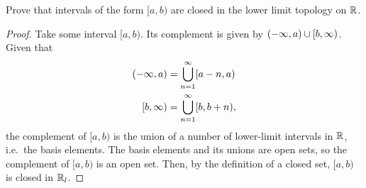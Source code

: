\documentclass[twocolumn, noxcolor, maketitle]{rbt-mathnotes-hw}
\begin{document}
\begin{problem}[1.32]
  Prove that intervals of the form $[a, b)$ are closed in the lower limit
  topology on $\mathbb{R}$.
\end{problem}
\begin{proof}
  Take some interval $[a, b)$. Its complement is given by $(-\infty, a) \cup
  [b, \infty)$. Given that
  \begin{alignat*}{1}
    (-\infty, a) &= \bigcup_{n=1}^\infty [a-n, a) \\
    [b, \infty) &= \bigcup_{n=1}^\infty [b, b+n),
  \end{alignat*}
  the complement of $[a, b)$ is the union of a number of lower-limit intervals
  in $\mathbb{R}$, i.e.~the basis elements. The basis elements and its unions are open
  sets, so the complement of $[a, b)$ is an open set. Then, by the definition of
  a closed set, $[a, b)$ is closed in $\mathbb{R}_l$.
\end{proof}
\end{document}
